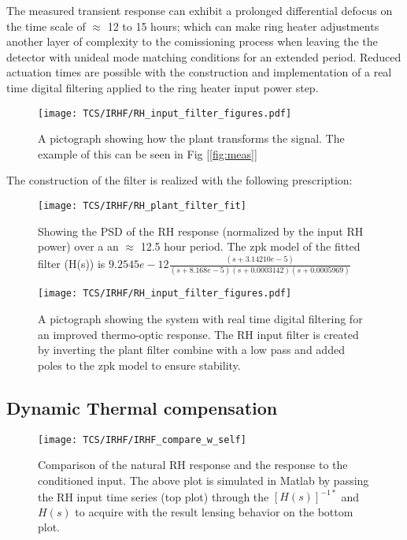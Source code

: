 The measured transient response can exhibit a prolonged differential defocus on the time scale of $\approx$ 12 to 15 hours; which can make ring heater adjustments another layer of complexity to the comissioning process when leaving the the detector with unideal mode matching conditions for an extended period. Reduced actuation times are possible with the construction and implementation of a real time digital filtering applied to the ring heater input power step.

\begin{figure}[H]
\centering
\texttt{[image: TCS/IRHF/RH\_input\_filter\_figures.pdf]}
\caption{A pictograph showing how the plant transforms the signal. The example of this can be seen in Fig [\ref{fig:meas}]}
\label{fig:justplant}
\end{figure}

The construction of the filter is realized with the following prescription:


\begin{figure}[H]
\texttt{[image: TCS/IRHF/RH\_plant\_filter\_fit]}
\caption{Showing the PSD of the RH response (normalized by the input RH power) over a an $\approx$ 12.5 hour period. The zpk model of the fitted filter (H(s)) is $9.2545e-12 \frac{(s+3.14210e-5)}{(s+8.168e-5)(s+0.0003142)(s+0.0005969)}$}
\label{fig:plant_v_fit}
\end{figure}

\begin{figure}[H]
\centering
\texttt{[image: TCS/IRHF/RH\_input\_filter\_figures.pdf]}
\caption{A pictograph showing the system with real time digital filtering for an improved thermo-optic response. The RH input filter is created by inverting the plant filter combine with a low pass and added poles to the zpk model to ensure stability.}
\label{fig:rtdf_pictograph}
\end{figure}

\subsection{Dynamic Thermal compensation}
\begin{figure}[H]
\texttt{[image: TCS/IRHF/IRHF\_compare\_w\_self]}
\caption{Comparison of the natural RH response and the response to the conditioned input. The above plot is simulated in Matlab by passing the RH input time series (top plot) through the $[H(s)]^{-1*}$ and $H(s)$ to acquire with the result lensing behavior on the bottom plot.}
\label{fig:dynam_comparison}
\end{figure}
\newpage


